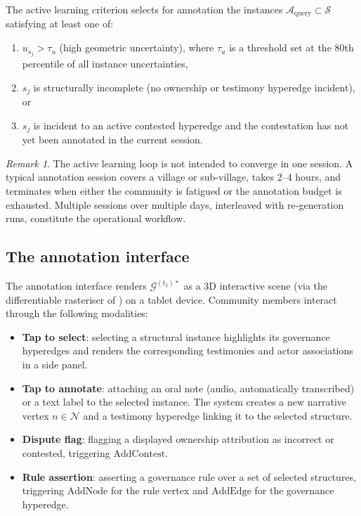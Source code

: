 \documentclass[11pt,a4paper]{article}
\theoremstyle{plain}
\theoremstyle{definition}
\theoremstyle{remark}
\newtheorem{remark}[theorem]{Remark}
\newcommand{\GS}{\mathcal{G}}
\newcommand{\Struc}{\mathcal{S}}
\newcommand{\Nar}{\mathcal{N}}
\begin{document}
The active learning criterion selects for annotation the instances
$\mathcal{A}_{\mathrm{query}} \subset \Struc$ satisfying at least one of:
\begin{enumerate}[leftmargin=2em]
  \item $u_{s_j} > \tau_u$ (high geometric uncertainty), where
    $\tau_u$ is a threshold set at the 80th percentile of all
    instance uncertainties,
  \item $s_j$ is structurally incomplete (no ownership or testimony
    hyperedge incident), or
  \item $s_j$ is incident to an active contested hyperedge and the
    contestation has not yet been annotated in the current session.
\end{enumerate}

\begin{remark}
The active learning loop is not intended to converge in one session.
A typical annotation session covers a village or sub-village, takes
2--4 hours, and terminates when either the community is fatigued or
the annotation budget is exhausted. Multiple sessions over multiple
days, interleaved with re-generation runs, constitute the operational
workflow.
\end{remark}

\subsection{The annotation interface}
\label{sec:layer5_interface}

The annotation interface renders $\GS^{(t_2)*}$ as a 3D interactive
scene (via the differentiable rasteriser of )
on a tablet device. Community members interact through the following
modalities:
\begin{itemize}[leftmargin=2em]
  \item \textbf{Tap to select}: selecting a structural instance
    highlights its governance hyperedges and renders the corresponding
    testimonies and actor associations in a side panel.
  \item \textbf{Tap to annotate}: attaching an oral note (audio,
    automatically transcribed) or a text label to the selected instance.
    The system creates a new narrative vertex $n \in \Nar$ and a
    testimony hyperedge linking it to the selected structure.
  \item \textbf{Dispute flag}: flagging a displayed ownership
    attribution as incorrect or contested, triggering
    $\mathrm{AddContest}$.
  \item \textbf{Rule assertion}: asserting a governance rule over a
    set of selected structures, triggering $\mathrm{AddNode}$ for the
    rule vertex and $\mathrm{AddEdge}$ for the governance hyperedge.
\end{itemize}
\end{document}
